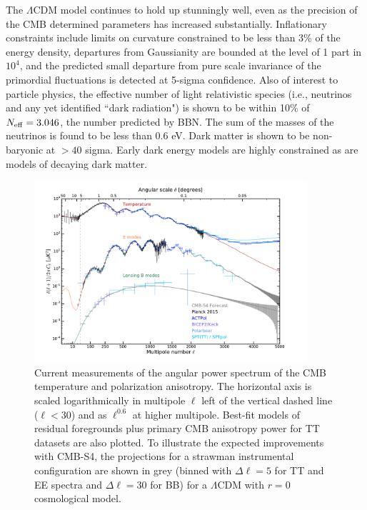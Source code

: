 The $\Lambda$CDM model continues to hold up stunningly well, even as the precision of the CMB determined parameters has increased substantially. Inflationary constraints include limits on curvature constrained to be less than 3\% of the energy density,
departures from Gaussianity are bounded at the level of 1 part in $10^4$,
and 
the predicted small departure from pure scale invariance of the primordial fluctuations is detected at 5-sigma confidence. Also of interest to particle physics, the effective number of light relativistic species (i.e., neutrinos and any yet identified ``dark radiation") is shown to be within 10\% of $N_\mathrm{eff} = 3.046$, the number predicted by BBN.  The sum of the masses of the neutrinos is found to be less than 0.6 eV. Dark matter is shown to be non-baryonic at $> 40$ sigma. Early dark energy models are highly constrained as are models of decaying dark matter. 

\begin{figure}[t]
\centering \includegraphics[width=0.9\textwidth]{Intro/CurrentCMB_withcmbs4.pdf}
\caption{Current measurements of the angular power spectrum of the CMB temperature and polarization anisotropy. The horizontal axis is scaled logarithmically in multipole $\ell$ left of the vertical dashed line ($\ell < 30$) and as $\ell^{0.6}$ at higher multipole.  Best-fit models of residual foregrounds plus primary CMB anisotropy power for TT datasets are also plotted. To illustrate the expected improvements with CMB-S4, the projections for a strawman instrumental configuration are shown in grey (binned with $\Delta\ell = 5$ for TT and EE spectra and $\Delta\ell = 30$ for BB) for a $\Lambda$CDM with $r =0$ cosmological model.}
\label{fig:CurrentCMB}
\end{figure}

